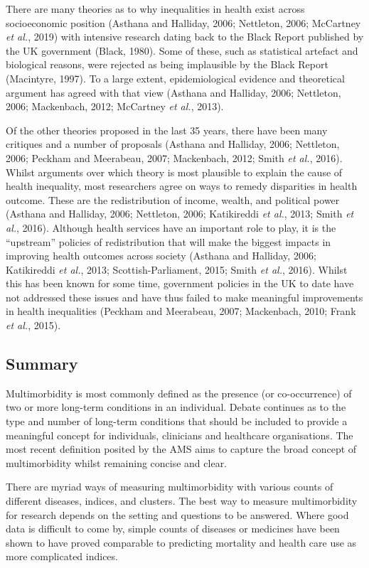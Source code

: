\documentclass[12pt,a4paper,oneside,table]{report}
\begin{document}
There are many theories as to why inequalities in health exist across
socioeconomic position (Asthana and Halliday, 2006; Nettleton, 2006;
McCartney \emph{et al.}, 2019) with intensive research dating back to
the Black Report published by the UK government (Black, 1980). Some of
these, such as statistical artefact and biological reasons, were
rejected as being implausible by the Black Report (Macintyre, 1997). To
a large extent, epidemiological evidence and theoretical argument has
agreed with that view (Asthana and Halliday, 2006; Nettleton, 2006;
Mackenbach, 2012; McCartney \emph{et al.}, 2013).

Of the other theories proposed in the last 35 years, there have been
many critiques and a number of proposals (Asthana and Halliday, 2006;
Nettleton, 2006; Peckham and Meerabeau, 2007; Mackenbach, 2012; Smith
\emph{et al.}, 2016). Whilst arguments over which theory is most
plausible to explain the cause of health inequality, most researchers
agree on ways to remedy disparities in health outcome. These are the
redistribution of income, wealth, and political power (Asthana and
Halliday, 2006; Nettleton, 2006; Katikireddi \emph{et al.}, 2013; Smith
\emph{et al.}, 2016). Although health services have an important role to
play, it is the ``upstream'' policies of redistribution that will make
the biggest impacts in improving health outcomes across society (Asthana
and Halliday, 2006; Katikireddi \emph{et al.}, 2013;
Scottish-Parliament, 2015; Smith \emph{et al.}, 2016). Whilst this has
been known for some time, government policies in the UK to date have not
addressed these issues and have thus failed to make meaningful
improvements in health inequalities (Peckham and Meerabeau, 2007;
Mackenbach, 2010; Frank \emph{et al.}, 2015).

\subsection{Summary}\label{subsec:mm-summary}

Multimorbidity is most commonly defined as the presence (or
co-occurrence) of two or more long-term conditions in an individual.
Debate continues as to the type and number of long-term conditions that
should be included to provide a meaningful concept for individuals,
clinicians and healthcare organisations. The most recent definition
posited by the AMS aims to capture the broad concept of multimorbidity
whilst remaining concise and clear.

There are myriad ways of measuring multimorbidity with various counts of
different diseases, indices, and clusters. The best way to measure
multimorbidity for research depends on the setting and questions to be
answered. Where good data is difficult to come by, simple counts of
diseases or medicines have been shown to have proved comparable to
predicting mortality and health care use as more complicated indices.
\end{document}
